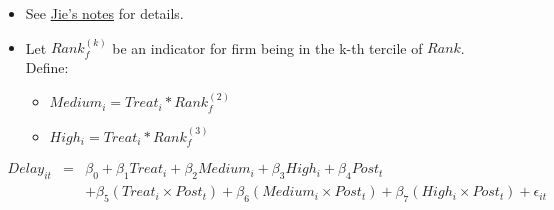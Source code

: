 \documentclass[
]{article}
\providecommand{\tightlist}{%
  \setlength{\itemsep}{0pt}\setlength{\parskip}{0pt}}
\begin{document}
\begin{itemize}
\tightlist
\item
  See
  \href{https://github.com/QuickPay-Operational-Performance/Data-and-code/blob/master/notes/Portfolio\%20model\%2B0308.pdf}{Jie's
  notes} for details.
\item
  Let \(Rank_f^{(k)}\) be an indicator for firm being in the k-th
  tercile of \(Rank\). Define:

  \begin{itemize}
  \tightlist
  \item
    \(Medium_i = Treat_i * Rank_f^{(2)}\)
  \item
    \(High_i = Treat_i * Rank_f^{(3)}\)
  \end{itemize}
\end{itemize}

\[\begin{aligned} Delay_{it}&=&\beta_0+\beta_1 Treat_i + \beta_2 Medium_i+\beta_3 High_i +\beta_4 Post_t\\ && +\beta_5( Treat_i\times Post_t) + \beta_6(Medium_i\times Post_t) + \beta_7(High_i\times Post_t) + \epsilon_{it} \end{aligned}\]
\end{document}
